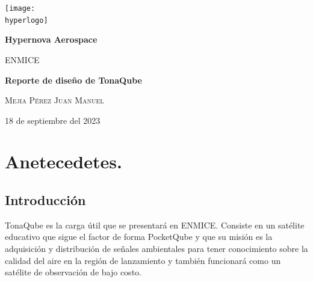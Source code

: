 \documentclass{article}%
\newcommand{\hyperlogo}{img/hyperlogo.png}
\newcommand{\practica}{Práctica n}%
\begin{document}
\begin{titlepage}
\centering
\texttt{[image: \\hyperlogo]}\par\vspace{1cm}
{\huge\bfseries{Hypernova Aerospace}}\par\vspace{0.4cm}
{\scshape{\large ENMICE}}\par\vspace{3cm}
{\bfseries{\huge Reporte de diseño de TonaQube}}\par\vspace{2cm}

\begin{flushleft}
\begin{tcolorbox}[enhanced jigsaw,breakable,pad at break*=1mm,
  colback=morado,colframe=white!25!black,title=\scshape\large Equipo,
  watermark color=white]
{\scshape\textcolor{blanco}{\normalsize Mejia Pérez Juan Manuel}}\par
{\scshape\textcolor{blanco}{\normalsize }}\par
\end{tcolorbox}\par\vspace{1cm}
\vfill
\end{flushleft}
{\large 18 de septiembre del 2023}
\end{titlepage}
\clearpage
\section{Anetecedetes.}
\subsection{Introducción}
\justify
TonaQube es la carga útil que se presentará en ENMICE. Consiste en un satélite
educativo que sigue el factor de forma PocketQube y que su misión es la adquisición
y distribución de señales ambientales para tener conocimiento sobre la calidad del 
aire en la región de lanzamiento y también funcionará como un satélite de observación de
bajo costo.
\end{document}
